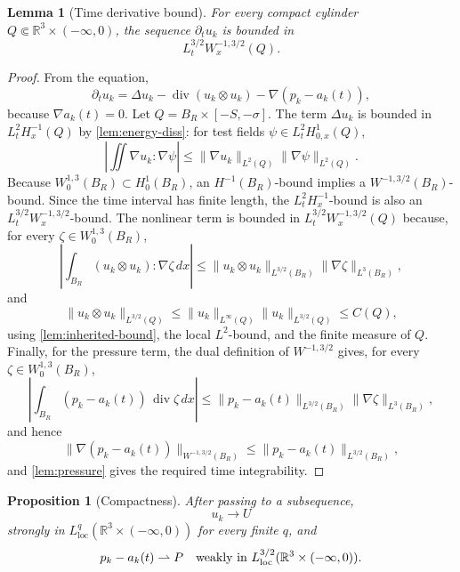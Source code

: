 \documentclass[11pt]{amsart}
\theoremstyle{plain}
\newtheorem{proposition}[theorem]{Proposition}
\newtheorem{lemma}[theorem]{Lemma}
\theoremstyle{definition}
\theoremstyle{remark}
\numberwithin{equation}{section}
\newcommand{\R}{\mathbb R}
\newcommand{\loc}{\mathrm{loc}}
\newcommand{\divergence}{\operatorname{div}}
\begin{document}
\begin{lemma}[Time derivative bound]\label{lem:time-derivative}
For every compact cylinder \(Q\Subset\R^3\times(-\infty,0)\), the sequence
\(\partial_tu_k\) is bounded in
\[
   L^{3/2}_tW^{-1,3/2}_x(Q).
\]
\end{lemma}

\begin{proof}
From the equation,
\[
   \partial_tu_k
   =
   \Delta u_k-\divergence(u_k\otimes u_k)-\nabla (p_k-a_k(t)),
\]
because \(\nabla a_k(t)=0\).  Let \(Q=B_R\times[-S,-\sigma]\).  The term
\(\Delta u_k\) is bounded in \(L^2_tH^{-1}_x(Q)\) by
\cref{lem:energy-diss}: for test fields \(\psi\in L^2_tH^1_{0,x}(Q)\),
\[
   \left|\iint \nabla u_k:\nabla\psi\right|
   \le \|\nabla u_k\|_{L^2(Q)}\|\nabla\psi\|_{L^2(Q)}.
\]
Because \(W^{1,3}_0(B_R)\subset H^1_0(B_R)\), an \(H^{-1}(B_R)\)-bound implies
a \(W^{-1,3/2}(B_R)\)-bound.  Since the time interval has finite length, the
\(L^2_tH^{-1}_x\)-bound is also an
\(L^{3/2}_tW^{-1,3/2}_x\)-bound.
The nonlinear term is bounded in \(L^{3/2}_tW^{-1,3/2}_x(Q)\) because, for
every \(\zeta\in W^{1,3}_0(B_R)\),
\[
   \left|\int_{B_R}(u_k\otimes u_k):\nabla\zeta\,dx\right|
   \le
   \|u_k\otimes u_k\|_{L^{3/2}(B_R)}
   \|\nabla\zeta\|_{L^3(B_R)} ,
\]
and
\[
   \|u_k\otimes u_k\|_{L^{3/2}(Q)}
   \le
   \|u_k\|_{L^\infty(Q)}
   \|u_k\|_{L^{3/2}(Q)}
   \le C(Q),
\]
using \cref{lem:inherited-bound}, the local \(L^2\)-bound, and the finite
measure of \(Q\).  Finally, for the pressure term, the dual definition of
\(W^{-1,3/2}\) gives, for every \(\zeta\in W^{1,3}_0(B_R)\),
\[
   \left|\int_{B_R}(p_k-a_k(t))\,\divergence \zeta\,dx\right|
   \le
   \|p_k-a_k(t)\|_{L^{3/2}(B_R)}
   \|\nabla\zeta\|_{L^3(B_R)} ,
\]
and hence
\[
   \|\nabla(p_k-a_k(t))\|_{W^{-1,3/2}(B_R)}
   \le \|p_k-a_k(t)\|_{L^{3/2}(B_R)},
\]
and \cref{lem:pressure} gives the required time integrability.
\end{proof}

\begin{proposition}[Compactness]\label{prop:compactness}
After passing to a subsequence,
\[
   u_k\to U
\]
strongly in \(L^q_{\loc}(\R^3\times(-\infty,0))\) for every finite \(q\), and
\[
   p_k-a_k(t)\rightharpoonup P
   \quad\hbox{weakly in }L^{3/2}_{\loc}(\R^3\times(-\infty,0)).
\]
\end{proposition}
\end{document}
